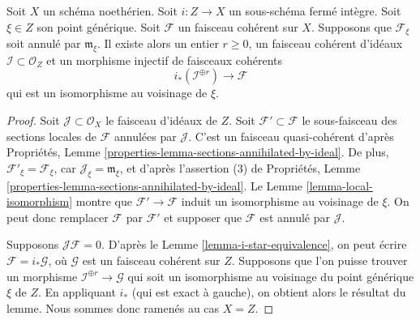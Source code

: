 \begin{lemma}
\label{lemma-prepare-filter-irreducible}
Soit $X$ un schéma noethérien.
Soit $i : Z \to X$ un sous-schéma fermé intègre.
Soit $\xi \in Z$ son point générique.
Soit $\mathcal{F}$ un faisceau cohérent sur $X$.
Supposons que $\mathcal{F}_\xi$ soit annulé par
$\mathfrak m_\xi$. Il existe alors un entier
$r \geq 0$, un faisceau cohérent d'idéaux $\mathcal{I} \subset \mathcal{O}_Z$
et un morphisme injectif de faisceaux cohérents
$$
i_*\left(\mathcal{I}^{\oplus r}\right) \to \mathcal{F}
$$
qui est un isomorphisme au voisinage de $\xi$.
\end{lemma}

\begin{proof}
Soit $\mathcal{J} \subset \mathcal{O}_X$ le faisceau d'idéaux de $Z$.
Soit $\mathcal{F}' \subset \mathcal{F}$ le sous-faisceau des
sections locales de $\mathcal{F}$ annulées par
$\mathcal{J}$. C'est un faisceau quasi-cohérent d'après
Propriétés, Lemme \ref{properties-lemma-sections-annihilated-by-ideal}.
De plus, $\mathcal{F}'_\xi = \mathcal{F}_\xi$, car
$\mathcal{J}_\xi = \mathfrak m_\xi$, et d'après l'assertion (3) de
Propriétés, Lemme \ref{properties-lemma-sections-annihilated-by-ideal}.
Le Lemme \ref{lemma-local-isomorphism} montre que
$\mathcal{F}' \to \mathcal{F}$
induit un isomorphisme au voisinage de $\xi$.
On peut donc remplacer $\mathcal{F}$ par $\mathcal{F}'$ et supposer
que $\mathcal{F}$ est annulé par $\mathcal{J}$.

\medskip\noindent
Supposons $\mathcal{J}\mathcal{F} = 0$. D'après le
Lemme \ref{lemma-i-star-equivalence}, on peut écrire
$\mathcal{F} = i_*\mathcal{G}$, où
$\mathcal{G}$ est un faisceau cohérent sur $Z$. Supposons que l'on puisse trouver un morphisme
$\mathcal{I}^{\oplus r} \to \mathcal{G}$ qui soit un isomorphisme
au voisinage du point générique $\xi$ de $Z$.
En appliquant $i_*$ (qui est exact à gauche), on obtient alors le résultat du lemme.
Nous sommes donc ramenés au cas $X = Z$.


\end{proof}
